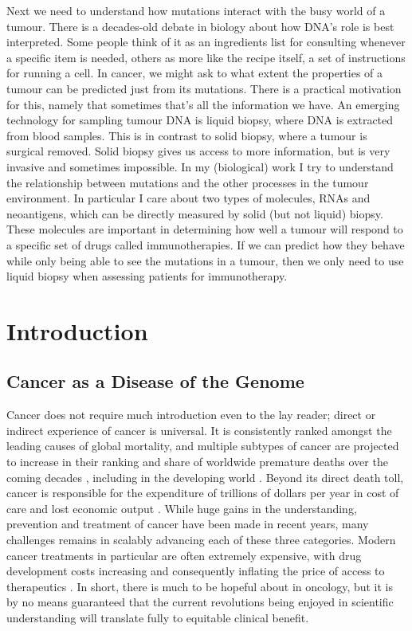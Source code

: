 \documentclass[10pt,twoside,openright]{report}
\begin{document}
Next we need to understand how mutations interact with the busy world of a tumour. There is a decades-old debate in biology about how DNA’s role is best interpreted. Some people think of it as an ingredients list for consulting whenever a specific item is needed, others as more like the recipe itself, a set of instructions for running a cell. In cancer, we might ask to what extent the properties of a tumour can be predicted just from its mutations. There is a practical motivation for this, namely that sometimes that’s all the information we have. An emerging technology for sampling tumour DNA is liquid biopsy, where DNA is extracted from blood samples. This is in contrast to solid biopsy, where a tumour is surgical removed. Solid biopsy gives us access to more information, but is very invasive and sometimes impossible. In my (biological) work I try to understand the relationship between mutations and the other processes in the tumour environment. In particular I care about two types of molecules, RNAs and neoantigens, which can be directly measured by solid (but not liquid) biopsy. These molecules are important in determining how well a tumour will respond to a specific set of drugs called immunotherapies. If we can predict how they behave while only being able to see the mutations in a tumour, then we only need to use liquid biopsy when assessing patients for immunotherapy. 

\printglossary[type=\acronymtype]

\tableofcontents

\chapter{Introduction}

\section{Cancer as a Disease of the Genome}
Cancer does not require much introduction even to the lay reader; direct or indirect experience of cancer is universal. It is consistently ranked amongst the leading causes of global mortality, and multiple subtypes of cancer are projected to increase in their ranking and share of worldwide premature deaths over the coming decades \citep{mathers_projections_2006}, including in the developing world \citep{kanavos_rising_2006}. Beyond its direct death toll, cancer is responsible for the expenditure of trillions of dollars per year in cost of care and lost economic output \citep{wild_world_2020}. While huge gains in the understanding, prevention and treatment of cancer have been made in recent years, many challenges remains in scalably advancing each of these three categories. Modern cancer treatments in particular are often extremely expensive, with drug development costs increasing and consequently inflating the price of access to therapeutics \citep{howard_pricing_2015}. In short, there is much to be hopeful about in oncology, but it is by no means guaranteed that the current revolutions being enjoyed in scientific understanding will translate fully to equitable clinical benefit.
\end{document}
